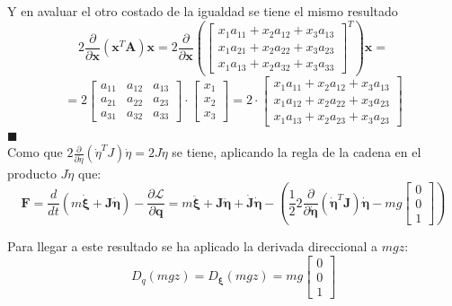 \documentclass[twoside,11pt]{report}
\begin{document}
Y en avaluar el otro costado de la igualdad se tiene el mismo resultado
\begin{equation}
2 \frac{\partial}{\partial \pmb{x}}(\pmb{x}^{T}\pmb{A})\pmb{x}=2 \frac{\partial}{\partial \pmb{x}} \left( \left[ \begin{array}{ccc}
x_1a_{11}+x_2a_{12}+x_3a_{13} \\
x_1a_{21}+x_2a_{22}+x_3a_{23} \\
x_1a_{13}+x_2a_{32}+x_3a_{33}
\end{array} \right]^{T} \right)\pmb{x}=
\end{equation}
\begin{equation}
=2\left[\begin{array}{ccc}
a_{11} & a_{12} & a_{13} \\
a_{21} & a_{22} & a_{23} \\
a_{31} & a_{32} & a_{33} 
\end{array} \right]\cdot\left[\begin{array}{c}
x_1 \\
x_2 \\
x_3
\end{array} \right]=2\cdot\left[ \begin{array}{c}
x_1a_{11}+x_2a_{12}+x_3a_{13} \\
x_1a_{12}+x_2a_{22}+x_3a_{23} \\
x_1a_{13}+x_2a_{23}+x_3a_{23}
\end{array} \right]
\end{equation}
\hfill $\blacksquare$ \\
Como que $2 \frac{\partial}{\partial \dot{\eta}}(\dot{\eta}^{T}J)\dot{\eta}=2 J \dot{\eta}$ se tiene, aplicando la regla de la cadena en el producto $J\dot{\eta}$ que:
\begin{equation}
\pmb{F}=\frac{d}{dt}\left(m \dot{\pmb{\xi}}+\pmb{J} \pmb{\dot{\eta}}\right)-\frac{\partial \mathcal{L}}{\partial \pmb{q}} =m\pmb{\ddot{\xi}} + \pmb{J}\pmb{\ddot{\eta}} + \pmb{\dot{J}}\pmb{\dot{\eta}}-\left( \frac{1}{2} 2 \frac{\partial}{\partial \pmb{\dot{\eta}}} ( \pmb{\dot{\eta}}^{T}\pmb{J})\pmb{\dot{\eta}} - mg\left[\begin{array}{c}
0 \\
0 \\
1
\end{array} \right] \right)
\end{equation}

Para llegar a este resultado se ha aplicado la derivada direccional a $mgz$:
\begin{equation}
D_q(mgz)=D_{\pmb{\xi}}(mgz)=mg \left[ \begin{array}{c}
0 \\
0 \\
1
\end{array} \right]
\end{equation}
\end{document}
